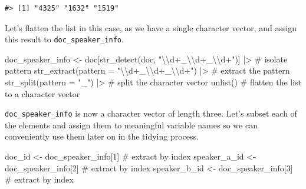 \documentclass[
  letterpaper,
]{latex/krantz}
\newenvironment{Shaded}{\begin{snugshade}}{\end{snugshade}}
\newcommand{\AttributeTok}[1]{\textcolor[rgb]{0.40,0.45,0.13}{#1}}
\newcommand{\CommentTok}[1]{\textcolor[rgb]{0.37,0.37,0.37}{#1}}
\newcommand{\DecValTok}[1]{\textcolor[rgb]{0.68,0.00,0.00}{#1}}
\newcommand{\FunctionTok}[1]{\textcolor[rgb]{0.28,0.35,0.67}{#1}}
\newcommand{\NormalTok}[1]{\textcolor[rgb]{0.00,0.23,0.31}{#1}}
\newcommand{\OtherTok}[1]{\textcolor[rgb]{0.00,0.23,0.31}{#1}}
\newcommand{\SpecialCharTok}[1]{\textcolor[rgb]{0.37,0.37,0.37}{#1}}
\newcommand{\StringTok}[1]{\textcolor[rgb]{0.13,0.47,0.30}{#1}}
\begin{document}
\begin{verbatim}
#> [1] "4325" "1632" "1519"
\end{verbatim}

Let's flatten the list in this case, as we have a single character
vector, and assign this result to \texttt{doc\_speaker\_info}.

\begin{Shaded}
\begin{Highlighting}[]
\NormalTok{doc\_speaker\_info }\OtherTok{\textless{}{-}} 
\NormalTok{  doc[}\FunctionTok{str\_detect}\NormalTok{(doc, }\StringTok{"}\SpecialCharTok{\textbackslash{}\textbackslash{}}\StringTok{d+\_}\SpecialCharTok{\textbackslash{}\textbackslash{}}\StringTok{d+\_}\SpecialCharTok{\textbackslash{}\textbackslash{}}\StringTok{d+"}\NormalTok{)] }\SpecialCharTok{|\textgreater{}} \CommentTok{\# isolate pattern}
  \FunctionTok{str\_extract}\NormalTok{(}\AttributeTok{pattern =} \StringTok{"}\SpecialCharTok{\textbackslash{}\textbackslash{}}\StringTok{d+\_}\SpecialCharTok{\textbackslash{}\textbackslash{}}\StringTok{d+\_}\SpecialCharTok{\textbackslash{}\textbackslash{}}\StringTok{d+"}\NormalTok{) }\SpecialCharTok{|\textgreater{}} \CommentTok{\# extract the pattern}
  \FunctionTok{str\_split}\NormalTok{(}\AttributeTok{pattern =} \StringTok{"\_"}\NormalTok{) }\SpecialCharTok{|\textgreater{}}  \CommentTok{\# split the character vector}
  \FunctionTok{unlist}\NormalTok{() }\CommentTok{\# flatten the list to a character vector}
\end{Highlighting}
\end{Shaded}

\texttt{doc\_speaker\_info} is now a character vector of length three.
Let's subset each of the elements and assign them to meaningful variable
names so we can conveniently use them later on in the tidying process.

\begin{Shaded}
\begin{Highlighting}[]
\NormalTok{doc\_id }\OtherTok{\textless{}{-}}\NormalTok{ doc\_speaker\_info[}\DecValTok{1}\NormalTok{] }\CommentTok{\# extract by index}
\NormalTok{speaker\_a\_id }\OtherTok{\textless{}{-}}\NormalTok{ doc\_speaker\_info[}\DecValTok{2}\NormalTok{] }\CommentTok{\# extract by index}
\NormalTok{speaker\_b\_id }\OtherTok{\textless{}{-}}\NormalTok{ doc\_speaker\_info[}\DecValTok{3}\NormalTok{] }\CommentTok{\# extract by index}
\end{Highlighting}
\end{Shaded}
\end{document}
